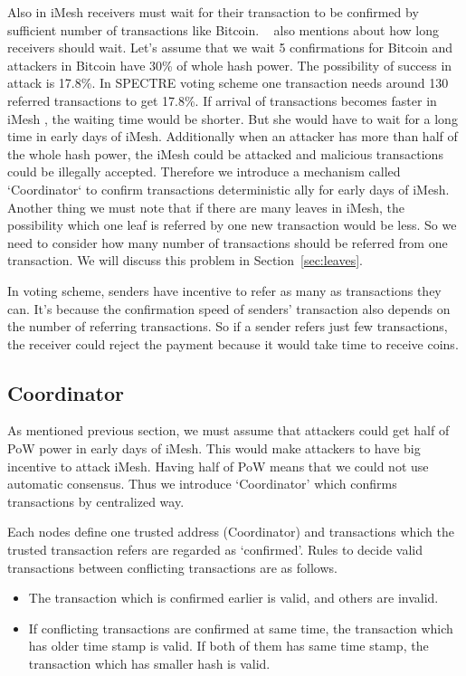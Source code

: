 \documentclass[a4paper,10pt,twocolumn]{article}
\begin{document}
 Also in iMesh receivers must wait for their transaction to be confirmed by sufficient number of transactions like Bitcoin.
~\cite{spectre}  also mentions about how long receivers should wait. Let's assume that we wait 5 confirmations for Bitcoin 
and attackers in Bitcoin have 30\% of whole hash power. The possibility of success in attack is 17.8\%\cite{btc}. In SPECTRE voting scheme
one transaction needs around 130 referred transactions to get 17.8\%. 
If arrival of transactions becomes faster in iMesh , the waiting time would be shorter. But she would have to wait for a long time
in early days of iMesh. Additionally when an attacker has more than half of the whole hash power, the iMesh could be attacked
and malicious transactions could be illegally accepted.
Therefore we introduce a mechanism called `Coordinator` to confirm transactions deterministic ally for early days of iMesh.
Another thing we must note that if there are many leaves in iMesh, the possibility which one leaf is referred by one new transaction
would be less. So we need to consider how many number of transactions should be referred from one transaction. We will discuss this problem
in Section~\ref{sec:leaves}.

In voting scheme, senders have incentive to refer as many as transactions they can.
It's because the confirmation speed of senders' transaction also depends on the number of referring transactions.
So if a sender refers just few transactions, the receiver could reject the payment because it would take time to receive coins.

\subsection{Coordinator}

As mentioned previous section, we must assume that attackers could get half of PoW power in early days of
iMesh. This would make attackers to have big incentive to attack iMesh. Having half of PoW means that
we could not use automatic consensus. Thus we introduce `Coordinator' which 
confirms transactions by centralized way.

Each nodes define one trusted address (Coordinator) and  transactions which the trusted transaction refers are regarded as `confirmed'.
Rules to decide valid transactions between conflicting transactions are as follows.

\begin{itemize}
	\item  The transaction which is confirmed earlier is valid, and others are invalid.
	\item If  conflicting transactions are confirmed at same time,
	the transaction which has older time stamp is valid.
	If both of them has same time stamp, the transaction which has smaller hash
	is valid.
\end{itemize}
\end{document}
